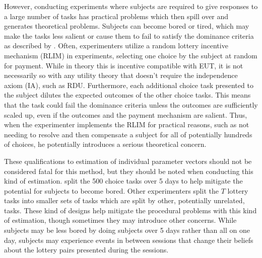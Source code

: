 \documentclass[../main.tex]{subfiles}
\begin{document}
\addtocounter{footnote}{-1}

However, conducting experiments where subjects are required to give responses to a large number of tasks has practical problems which then spill over and generates theoretical problems.
Subjects can become bored or tired, which may make the tasks less salient or cause them to fail to satisfy the dominance criteria as described by \textcite{Harrison1992}.
Often, experimenters utilize a random lottery incentive mechanism (RLIM) in experiments, selecting one choice by the subject at random for payment.
While in theory this is incentive compatible with EUT, it is not necessarily so with any utility theory that doesn't require the independence axiom (IA), such as RDU.
Furthermore, each additional choice task presented to the subject dilutes the expected outcomes of the other choice tasks.
This means that the task could fail the dominance criteria unless the outcomes are sufficiently scaled up, even if the outcomes and the payment mechanism are salient.
Thus, when the experimenter implements the RLIM for practical reasons, such as not needing to resolve and then compensate a subject for all of potentially hundreds of choices, he potentially introduces a serious theoretical concern.

These qualifications to estimation of individual parameter vectors should not be considered fatal for this method, but they should be noted when conducting this kind of estimation.
\textcite{Hey2001} split the 500 choice tasks over 5 days to help mitigate the potential for subjects to become bored.
Other experimenters split the $T$ lottery tasks into smaller sets of tasks which are split by other, potentially unrelated, tasks.
These kind of designs help mitigate the procedural problems with this kind of estimation, though sometimes they may introduce other concerns.
While subjects may be less bored by doing subjects over 5 days rather than all on one day, subjects may experience events in between sessions that change their beliefs about the lottery pairs presented during the sessions.
\end{document}
